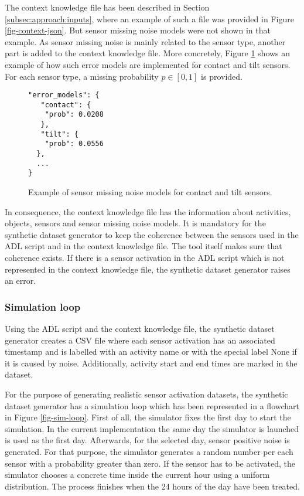 The context knowledge file has been described in Section \ref{subsec:approach:inputs}, where an example of such a file was provided in Figure \ref{fig-context-json}. But sensor missing noise models were not shown in that example. As sensor missing noise is mainly related to the sensor type, another part is added to the context knowledge file. More concretely, Figure \ref{fig-missing-noise} shows an example of how such error models are implemented for contact and tilt sensors. For each sensor type, a missing probability $p \in [0, 1]$ is provided. 

\begin{figure}[htbp]
\begin{small}
\begin{lstlisting}
"error_models": {
   "contact": {
	"prob": 0.0208
   },
   "tilt": {
	"prob": 0.0556
  },
  ...
}
\end{lstlisting}
\end{small}
\caption{Example of sensor missing noise models for contact and tilt sensors.}
\label{fig-missing-noise}
\end{figure}

In consequence, the context knowledge file has the information about activities, objects, sensors and sensor missing noise models. It is mandatory for the synthetic dataset generator to keep the coherence between the sensors used in the ADL script and in the context knowledge file. The tool itself makes sure that coherence exists. If there is a sensor activation in the ADL script which is not represented in the context knowledge file, the synthetic dataset generator raises an error.

\subsubsection*{Simulation loop}

Using the ADL script and the context knowledge file, the synthetic dataset generator creates a CSV file where each sensor activation has an associated timestamp and is labelled with an activity name or with the special label None if it is caused by noise. Additionally, activity start and end times are marked in the dataset.

For the purpose of generating realistic sensor activation datasets, the synthetic dataset generator has a simulation loop which has been represented in a flowchart in Figure \ref{fig-sim-loop}. First of all, the simulator fixes the first day to start the simulation. In the current implementation the same day the simulator is launched is used as the first day. Afterwards, for the selected day, sensor positive noise is generated. For that purpose, the simulator generates a random number per each sensor with a probability greater than zero. If the sensor has to be activated, the simulator chooses a concrete time inside the current hour using a uniform distribution. The process finishes when the 24 hours of the day have been treated.

